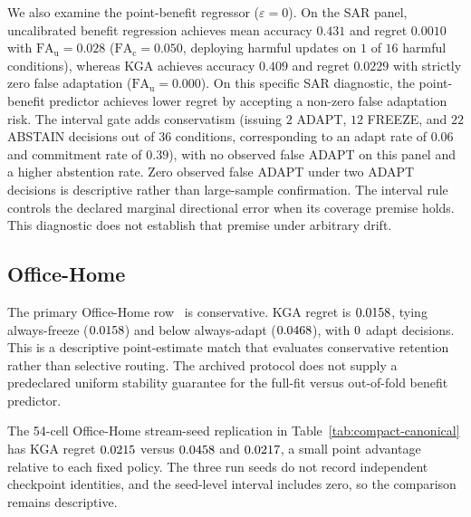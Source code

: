 We also examine the point-benefit regressor ($\varepsilon=0$). On the SAR panel, uncalibrated benefit regression achieves
mean accuracy $0.431$ and regret $0.0010$ with $\mathrm{FA}_{\mathrm u} = 0.028$ ($\mathrm{FA}_{\mathrm c} = 0.050$, deploying harmful updates on $1$ of $16$ harmful conditions),
whereas KGA achieves accuracy $0.409$ and regret $0.0229$ with strictly zero false adaptation ($\mathrm{FA}_{\mathrm u} = 0.000$).
On this specific SAR diagnostic, the point-benefit predictor achieves lower regret by accepting a non-zero false adaptation risk.
The interval gate adds conservatism (issuing $2$ ADAPT, $12$ FREEZE, and $22$ ABSTAIN decisions out of $36$ conditions,
corresponding to an adapt rate of $0.06$ and commitment rate of $0.39$), with no observed false ADAPT on this panel and a higher abstention rate.
Zero observed false ADAPT under two ADAPT decisions is descriptive rather than large-sample confirmation. The interval rule controls the declared marginal
directional error when its coverage premise holds. This diagnostic does not establish that premise under arbitrary drift.

\subsection{Office-Home}

The primary Office-Home row~\cite{venkateswara2017officehome} is conservative. KGA regret is $0.0158$, tying always-freeze
($0.0158$) and below always-adapt ($0.0468$), with $0$ adapt decisions. This is a
descriptive point-estimate match that evaluates conservative retention rather than selective
routing. The archived protocol does not supply a predeclared uniform stability guarantee for the
full-fit versus out-of-fold benefit predictor.

The 54-cell Office-Home stream-seed replication in Table~\ref{tab:compact-canonical} has KGA regret
$0.0215$ versus $0.0458$ and $0.0217$, a small point advantage relative to each fixed
policy. The three run seeds do not record independent checkpoint identities, and the seed-level
interval includes zero, so the comparison remains descriptive.

